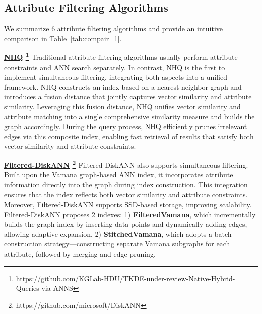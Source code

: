 \documentclass[sigconf, nonacm]{acmart}
\begin{document}
	
	
	
	\subsection{Attribute Filtering Algorithms}
	
	We summarize 6 attribute filtering algorithms and provide an intuitive comparison in Table~\ref{tab:compair_1}.

	\noindent\textbf{\underline{NHQ} \footnote{https://github.com/KGLab-HDU/TKDE-under-review-Native-Hybrid-Queries-via-ANNS} \cite{NHQ}}
	Traditional attribute filtering algorithms usually perform attribute constraints and ANN search separately. In contrast, NHQ is the first to implement simultaneous filtering, integrating both aspects into a unified framework. NHQ constructs an index based on a nearest neighbor graph and introduces a fusion distance that jointly captures vector similarity and attribute similarity. Leveraging this fusion distance, NHQ unifies vector similarity and attribute matching into a single comprehensive similarity measure and builds the graph accordingly. During the query process, NHQ efficiently prunes irrelevant edges via this composite index, enabling fast retrieval of results that satisfy both vector similarity and attribute constraints.
	
	\noindent\textbf{\underline{Filtered-DiskANN} \footnote{https://github.com/microsoft/DiskANN} \cite{Filtered-diskann}}
	Filtered-DiskANN also supports simultaneous filtering. Built upon the Vamana \cite{diskann} graph-based ANN index, it incorporates attribute information directly into the graph during index construction. This integration ensures that the index reflects both vector similarity and attribute constraints. Moreover, Filtered-DiskANN supports SSD-based storage, improving scalability.
	Filtered-DiskANN proposes 2 indexes:  
	1) \textbf{FilteredVamana}, which incrementally builds the graph index by inserting data points and dynamically adding edges, allowing adaptive expansion.  
	2) \textbf{StitchedVamana}, which adopts a batch construction strategy—constructing separate Vamana subgraphs for each attribute, followed by merging and edge pruning.
	
\end{document}
